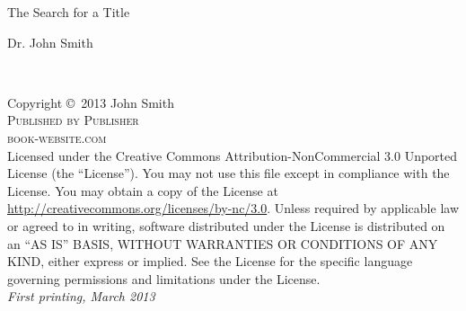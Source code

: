\documentclass[11pt,fleqn]{book} %
\begin{document}

\begingroup
\thispagestyle{empty}
\centering
\vspace*{9cm}
\par\normalfont\fontsize{35}{35}\sffamily\selectfont
The Search for a Title\par %
\vspace*{1cm}
{\Huge Dr. John Smith}\par %
\endgroup


\newpage
~\vfill
\thispagestyle{empty}

\noindent Copyright \copyright\ 2013 John Smith\\ %

\noindent \textsc{Published by Publisher}\\ %

\noindent \textsc{book-website.com}\\ %

\noindent Licensed under the Creative Commons Attribution-NonCommercial 3.0 Unported License (the ``License''). You may not use this file except in compliance with the License. You may obtain a copy of the License at \url{http://creativecommons.org/licenses/by-nc/3.0}. Unless required by applicable law or agreed to in writing, software distributed under the License is distributed on an \textsc{``AS IS'' BASIS, WITHOUT WARRANTIES OR CONDITIONS OF ANY KIND}, either express or implied. See the License for the specific language governing permissions and limitations under the License.\\ %

\noindent \textit{First printing, March 2013} %


\end{document}
